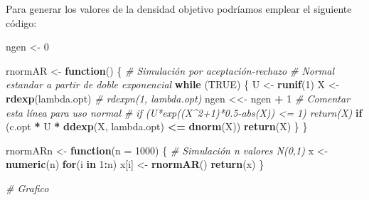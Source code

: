 \documentclass[
]{book}
\newenvironment{Shaded}{\begin{snugshade}}{\end{snugshade}}
\newcommand{\CommentTok}[1]{\textcolor[rgb]{0.56,0.35,0.01}{\textit{#1}}}
\newcommand{\ControlFlowTok}[1]{\textcolor[rgb]{0.13,0.29,0.53}{\textbf{#1}}}
\newcommand{\DataTypeTok}[1]{\textcolor[rgb]{0.13,0.29,0.53}{#1}}
\newcommand{\DecValTok}[1]{\textcolor[rgb]{0.00,0.00,0.81}{#1}}
\newcommand{\KeywordTok}[1]{\textcolor[rgb]{0.13,0.29,0.53}{\textbf{#1}}}
\newcommand{\NormalTok}[1]{#1}
\newcommand{\OperatorTok}[1]{\textcolor[rgb]{0.81,0.36,0.00}{\textbf{#1}}}
\newcommand{\OtherTok}[1]{\textcolor[rgb]{0.56,0.35,0.01}{#1}}
\newcommand{\StringTok}[1]{\textcolor[rgb]{0.31,0.60,0.02}{#1}}
\theoremstyle{break}
\theoremstyle{definition}
\theoremstyle{definition}
\theoremstyle{definition}
\theoremstyle{remark}
\begin{document}
Para generar los valores de la densidad objetivo podríamos emplear el siguiente código:

\begin{Shaded}
\begin{Highlighting}[]
\NormalTok{ngen <-}\StringTok{ }\DecValTok{0}

\NormalTok{rnormAR <-}\StringTok{ }\ControlFlowTok{function}\NormalTok{() \{}
\CommentTok{# Simulación por aceptación-rechazo}
\CommentTok{# Normal estandar a partir de doble exponencial}
  \ControlFlowTok{while}\NormalTok{ (}\OtherTok{TRUE}\NormalTok{) \{}
\NormalTok{    U <-}\StringTok{ }\KeywordTok{runif}\NormalTok{(}\DecValTok{1}\NormalTok{)}
\NormalTok{    X <-}\StringTok{ }\KeywordTok{rdexp}\NormalTok{(lambda.opt) }\CommentTok{# rdexpn(1, lambda.opt)}
\NormalTok{    ngen <<-}\StringTok{ }\NormalTok{ngen }\OperatorTok{+}\StringTok{ }\DecValTok{1} \CommentTok{# Comentar esta línea para uso normal}
    \CommentTok{# if (U*exp((X^2+1)*0.5-abs(X)) <= 1) return(X)}
    \ControlFlowTok{if}\NormalTok{ (c.opt }\OperatorTok{*}\StringTok{ }\NormalTok{U }\OperatorTok{*}\StringTok{ }\KeywordTok{ddexp}\NormalTok{(X, lambda.opt) }\OperatorTok{<=}\StringTok{ }\KeywordTok{dnorm}\NormalTok{(X)) }\KeywordTok{return}\NormalTok{(X)}
\NormalTok{  \}}
\NormalTok{\}}

\NormalTok{rnormARn <-}\StringTok{ }\ControlFlowTok{function}\NormalTok{(}\DataTypeTok{n =} \DecValTok{1000}\NormalTok{) \{}
\CommentTok{# Simulación n valores N(0,1)}
\NormalTok{    x <-}\StringTok{ }\KeywordTok{numeric}\NormalTok{(n)}
    \ControlFlowTok{for}\NormalTok{(i }\ControlFlowTok{in} \DecValTok{1}\OperatorTok{:}\NormalTok{n) x[i] <-}\StringTok{ }\KeywordTok{rnormAR}\NormalTok{()}
    \KeywordTok{return}\NormalTok{(x)}
\NormalTok{\}}

\CommentTok{# Grafico}
\end{Highlighting}
\end{Shaded}
\end{document}
